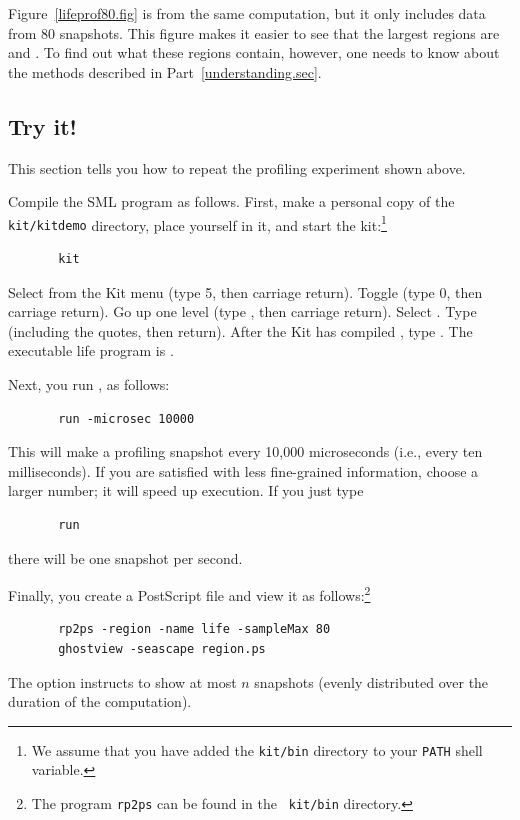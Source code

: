 \documentclass[12pt]{book}
\begin{document}
Figure~\ref{lifeprof80.fig} is from the same computation, but it only includes
data from 80 snapshots. This figure makes it easier to see that the largest
regions are  and . To find out what these regions contain,
however, one needs to know about the methods described in Part~\ref{understanding.sec}.

\subsection{Try it!}
This section tells you how to repeat the profiling experiment shown above. 

Compile the SML program  as follows. First,
make a personal copy of the {\tt kit/kitdemo} directory, place
yourself in it, and start the kit:\footnote{We assume that you have added
  the {\tt kit/bin} directory to your {\tt PATH} shell variable.}
\begin{verbatim}
       kit
\end{verbatim}
Select  from the Kit menu (type 5, then carriage return).
Toggle  (type 0, then carriage return). Go up one
level (type , then carriage return). Select .
Type  (including the quotes, then return). After the Kit has compiled
, type . The executable life program
is .

Next, you run , as follows:
\begin{verbatim}
       run -microsec 10000
\end{verbatim}
This will make a profiling snapshot every 10,000 microseconds (i.e., every 
ten milliseconds). If you are satisfied with less fine-grained information,
choose a larger number; it will speed up execution. If you just type
\begin{verbatim}
       run 
\end{verbatim}
there will be one snapshot per second.

Finally, you create a PostScript file and view it as
follows:\footnote{The program {\tt rp2ps} can be found in the {\tt
    kit/bin} directory.}
%
\begin{verbatim}
       rp2ps -region -name life -sampleMax 80 
       ghostview -seascape region.ps
\end{verbatim}
The option  instructs  
to show at most $n$ snapshots (evenly distributed
over the duration of the computation).
\end{document}
